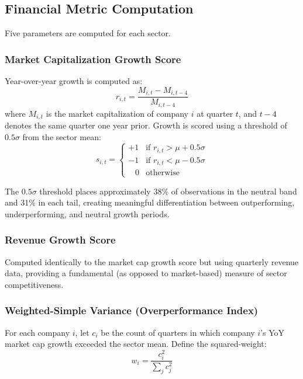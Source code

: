 \documentclass[11pt]{article}
\begin{document}
\subsection{Financial Metric Computation}

Five parameters are computed for each sector.

\subsubsection{Market Capitalization Growth Score}
Year-over-year growth is computed as:
\begin{equation}
    r_{i,t} = \frac{M_{i,t} - M_{i,t-4}}{M_{i,t-4}}
\end{equation}
where $M_{i,t}$ is the market capitalization of company $i$ at quarter $t$, and $t-4$ denotes the same quarter one year prior. Growth is scored using a threshold of $0.5\sigma$ from the sector mean:
\begin{equation}
    s_{i,t} = \begin{cases}
    +1 & \text{if } r_{i,t} > \mu + 0.5\sigma \\
    -1 & \text{if } r_{i,t} < \mu - 0.5\sigma \\
    \;\;\;0 & \text{otherwise}
    \end{cases}
\end{equation}

The $0.5\sigma$ threshold places approximately 38\% of observations in the neutral band and 31\% in each tail, creating meaningful differentiation between outperforming, underperforming, and neutral growth periods.

\subsubsection{Revenue Growth Score}
Computed identically to the market cap growth score but using quarterly revenue data, providing a fundamental (as opposed to market-based) measure of sector competitiveness.

\subsubsection{Weighted-Simple Variance (Overperformance Index)}
For each company $i$, let $c_i$ be the count of quarters in which company $i$'s YoY market cap growth exceeded the sector mean. Define the squared-weight:
\begin{equation}
    w_i = \frac{c_i^2}{\sum_{j} c_j^2}
\end{equation}
\end{document}
